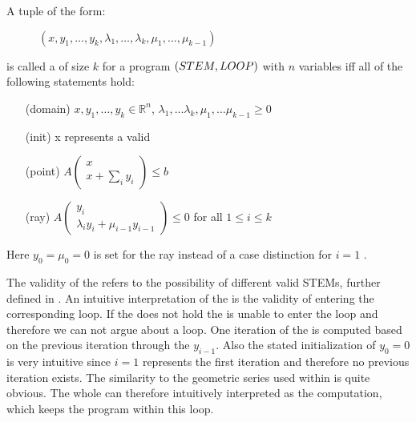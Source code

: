 \begin{definition}
	\label{def:gna}
	A tuple of the form:
	\begin{figure}[H]
		\centering
		$(x, y_1, \dots, y_k, \lambda_1, \dots, \lambda_k, \mu_1, \dots, \mu_{k-1})$
	\end{figure}  
	\vspace{-1em}
	is called a \gna of size $k$ for a program $(STEM, LOOP)$ with $n$ variables iff all of the following statements hold:
	\begin{itemize}
		\setlength{\itemindent}{1in}
		\item[(domain)] $x, y_1, \dots, y_k \in \mathbb{R}^n$, $\lambda_1, \dots \lambda_k, \mu_1, \dots \mu_{k-1} \ge 0$
		\item[(init)] x represents a valid \stem
		\item[(point)] $A\begin{pmatrix} x \\ x + \sum_i y_i \end{pmatrix} \le b$
		\item[(ray)] $A\begin{pmatrix} y_i \\ \lambda_i y_i + \mu_{i-1} y_{i-1} \end{pmatrix} \le 0$ for all $1 \le i \le k$
	\end{itemize}
	Here $y_0 = \mu_0 = 0$ is set for the ray instead of a case distinction for $i=1$ \cite{leike2014geometric}.
\end{definition}
The validity of the \initc refers to the possibility of different valid STEMs, further defined in .
An intuitive interpretation of the \pointc is the validity of entering the corresponding loop. If the \pointc does not hold the \its is unable to enter the loop and therefore we can not argue about a \nonterm loop. One iteration of the \rayc is computed based on the previous iteration through the $y_{i-1}$. Also the stated initialization of $y_0=0$ is very intuitive since $i=1$ represents the first iteration and therefore no previous iteration exists. The similarity to the geometric series used within \cite{leike2014geometric} is quite obvious. The whole \rayc can therefore intuitively interpreted as the computation, which keeps the program within this loop. 
